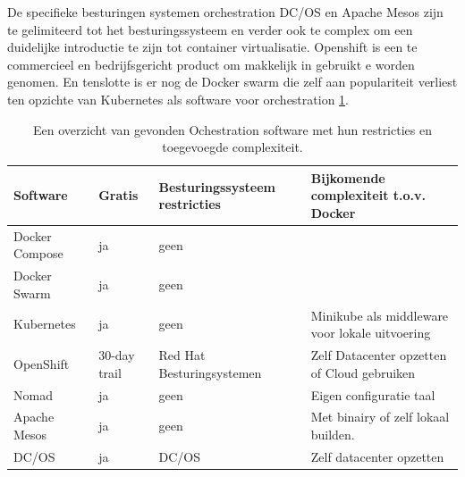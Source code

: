 De specifieke besturingen systemen orchestration DC/OS en Apache Mesos zijn te gelimiteerd tot het besturingssysteem en verder ook te complex om een duidelijke introductie te zijn tot container virtualisatie.  Openshift is een te commercieel en bedrijfsgericht product om makkelijk in gebruikt e worden genomen. En tenslotte is er nog de Docker swarm die zelf aan populariteit verliest ten opzichte van Kubernetes als software voor orchestration \ref{tab:Ochestration}.
\begin{center}
    \begin{table}
        \begin{tabular}{ m{3cm} || m{1.5cm} | m{3.3cm} | m{4.5cm} }
            Software & Gratis & Besturingssysteem restricties & Bijkomende complexiteit t.o.v. Docker \\ 
            \hline
            Docker Compose & ja & geen &  \\  
            \hline
            Docker Swarm & ja & geen & \\
            \hline 
            Kubernetes & ja & geen & Minikube als middleware voor lokale uitvoering \\
            \hline
            OpenShift & 30-day trail & Red Hat Besturingsystemen & Zelf Datacenter opzetten of Cloud gebruiken \\
            \hline
            Nomad & ja & geen & Eigen configuratie taal \\
            \hline
            Apache Mesos & ja & geen & Met binairy of zelf lokaal builden.  \\
            \hline 
            DC/OS & ja & DC/OS & Zelf datacenter opzetten \\
        \end{tabular}
        \label{tab:Ochestration}
        \caption[Overzicht ochestration]{Een overzicht van gevonden Ochestration software met hun restricties en toegevoegde complexiteit.}
    \end{table}
\end{center}


